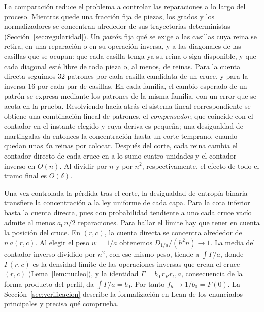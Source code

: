 
La comparación reduce el problema a controlar las reparaciones a lo largo del
proceso. Mientras quede una fracción fija de piezas, los grados y los normalizadores
se concentran alrededor de sus trayectorias deterministas (Sección~\ref{sec:regularidad}).
Un \emph{patrón} fija qué se exige a las casillas cuya reina se retira, en una reparación o
en su operación inversa, y a las diagonales de las casillas que se ocupan: que cada casilla
tenga ya su reina o siga disponible, y que cada diagonal esté libre de toda pieza o, al
menos, de reinas. Para la cuenta directa seguimos $32$ patrones
por cada casilla candidata de un cruce, y para la inversa $16$ por cada par de casillas.
En cada familia, el cambio esperado de un patrón se expresa mediante los patrones de la
misma familia, con un error que se acota en la prueba. Resolviendo hacia atrás el sistema
lineal correspondiente se obtiene una combinación lineal de patrones, el \emph{compensador},
que coincide con el contador en el instante elegido y cuya deriva es pequeña; una
desigualdad de martingalas da entonces la concentración hasta un corte
temprano, cuando quedan unas $\delta n$ reinas por colocar. Después del corte, cada reina
cambia el contador directo de cada cruce en a lo sumo cuatro unidades y el contador
inverso en $O(n)$. Al dividir por $n$ y por $n^2$, respectivamente, el efecto
de todo el tramo final es $O(\delta)$.

Una vez controlada la pérdida tras el corte, la desigualdad de entropía binaria
transfiere la concentración a la ley uniforme de cada capa. Para la cota inferior
basta la cuenta directa, pues con probabilidad tendiente a uno cada cruce vacío
admite al menos $a_0n/2$ reparaciones. Para hallar el límite hay que tener en
cuenta la posición del cruce. En $(r,c)$, la cuenta directa se concentra alrededor
de $n\,a(\bar r,\bar c)$. Al elegir el peso $w=1/a$ obtenemos
$D_{1/a}/(h^2n)\to1$. La media del contador inverso dividido por $n^2$, con ese mismo
peso, tiende a $\int\Gamma/a$,
donde $\Gamma(r,c)$ es la densidad límite de las operaciones inversas que crean el cruce $(r,c)$
(Lema~\ref{lem:nucleo}), y la identidad $\Gamma=b_0\,r_Rr_C\,a$, consecuencia de la forma producto del
perfil, da $\int\Gamma/a=b_0$. Por tanto $f_h\to1/b_0=F(0)$.
\ifverificacionLean
La Sección~\ref{sec:verificacion} describe la formalización en Lean de los enunciados
principales y precisa qué comprueba.
\fi

